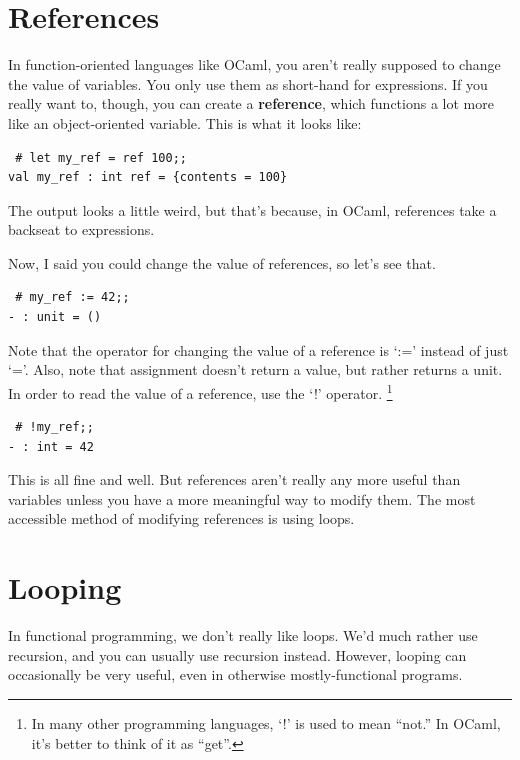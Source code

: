 \documentclass[10pt]{book}
\begin{document}
{\section{References}


In function-oriented languages like OCaml, you 
aren't really supposed to change the value of 
variables. You only use them as short-hand for 
expressions. If you really want to, though, you 
can create a {\bf reference}, which functions
a lot more like an object-oriented variable. 
This is what it looks like:

\beforeverb
\begin{verbatim}
 # let my_ref = ref 100;;
val my_ref : int ref = {contents = 100}
\end{verbatim}
\afterverb

The output looks a little weird, but that's because, 
in OCaml, references take a backseat to expressions.

Now, I said you could change the value of references, 
so let's see that.

\beforeverb
\begin{verbatim}
 # my_ref := 42;;
- : unit = ()
\end{verbatim}
\afterverb

Note that the operator for changing the value of a reference is `:=' instead of just `='. Also, note that
assignment doesn't return a value, but rather returns a unit. In order to read the value of a reference, use
the `!' operator. \footnote{In many other programming languages, `!' is used to mean ``not.'' In OCaml, it's 
better to think of it as ``get''.}

\beforeverb
\begin{verbatim}
 # !my_ref;;
- : int = 42
\end{verbatim}
\afterverb

This is all fine and well. But references aren't really any more useful than variables
unless you have a more meaningful way to modify them. The most accessible
method of modifying references is using loops.

\section{Looping}

In functional programming, we don't really like loops. We'd much rather
use recursion, and you can usually use recursion instead. However, looping
can occasionally be very useful, even in otherwise mostly-functional programs.

}
\end{document}
